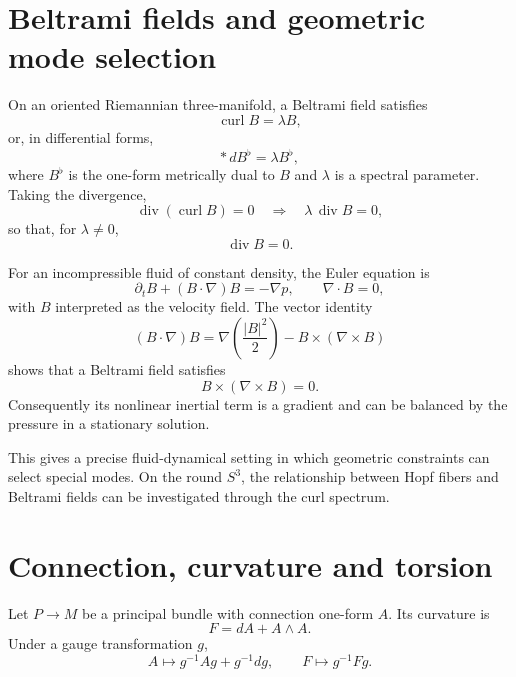 \documentclass[11pt,a4paper]{article}
\newcommand{\curl}{\operatorname{curl}}
\renewcommand{\div}{\operatorname{div}}
\begin{document}
\section{Beltrami fields and geometric mode selection}

On an oriented Riemannian three-manifold, a Beltrami field satisfies
\begin{equation}
\curl B=\lambda B,
\end{equation}
or, in differential forms,
\begin{equation}
{*}\,dB^\flat=\lambda B^\flat ,
\end{equation}
where $B^\flat$ is the one-form metrically dual to $B$ and $\lambda$ is a
spectral parameter. Taking the divergence,
\begin{equation}
\div(\curl B)=0\quad\Longrightarrow\quad\lambda\,\div B=0,
\end{equation}
so that, for $\lambda\neq0$,
\begin{equation}
\div B=0 .
\end{equation}

For an incompressible fluid of constant density, the Euler equation is
\begin{equation}
\partial_tB+(B\cdot\nabla)B=-\nabla p,\qquad \nabla\cdot B=0,
\end{equation}
with $B$ interpreted as the velocity field. The vector identity
\begin{equation}
(B\cdot\nabla)B=\nabla\!\left(\frac{|B|^2}{2}\right)-B\times(\nabla\times B)
\end{equation}
shows that a Beltrami field satisfies
\begin{equation}
B\times(\nabla\times B)=0 .
\end{equation}
Consequently its nonlinear inertial term is a gradient and can be balanced by
the pressure in a stationary solution.

This gives a precise fluid-dynamical setting in which geometric constraints can
select special modes. On the round $S^3$, the relationship between Hopf fibers
and Beltrami fields can be investigated through the curl spectrum.

\section{Connection, curvature and torsion}

Let $P\to M$ be a principal bundle with connection one-form $A$. Its curvature
is
\begin{equation}
F=dA+A\wedge A .
\end{equation}
Under a gauge transformation $g$,
\begin{equation}
A\mapsto g^{-1}Ag+g^{-1}dg,\qquad F\mapsto g^{-1}Fg .
\end{equation}
\end{document}

